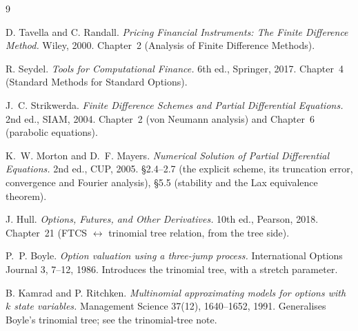 \documentclass[11pt,a4paper]{article}
\begin{document}
\begin{thebibliography}{9}

D. Tavella and C. Randall.
\emph{Pricing Financial Instruments: The Finite Difference Method.}
Wiley, 2000. Chapter~2 (Analysis of Finite Difference Methods).

R. Seydel.
\emph{Tools for Computational Finance.}
6th ed., Springer, 2017. Chapter~4 (Standard Methods for Standard
Options).

J.~C. Strikwerda.
\emph{Finite Difference Schemes and Partial Differential Equations.}
2nd ed., SIAM, 2004. Chapter~2 (von Neumann analysis) and Chapter~6
(parabolic equations).

K.~W. Morton and D.~F. Mayers.
\emph{Numerical Solution of Partial Differential Equations.}
2nd ed., CUP, 2005. \S2.4--2.7 (the explicit scheme, its truncation
error, convergence and Fourier analysis), \S5.5 (stability and the
Lax equivalence theorem).

J. Hull.
\emph{Options, Futures, and Other Derivatives.}
10th ed., Pearson, 2018. Chapter~21 (FTCS \(\leftrightarrow\) trinomial
tree relation, from the tree side).

P.~P. Boyle.
\emph{Option valuation using a three-jump process.}
International Options Journal 3, 7--12, 1986. Introduces the
trinomial tree, with a stretch parameter.

B. Kamrad and P. Ritchken.
\emph{Multinomial approximating models for options with $k$ state
variables.}
Management Science 37(12), 1640--1652, 1991. Generalises Boyle's
trinomial tree; see the trinomial-tree note.

\end{thebibliography}
\end{document}
